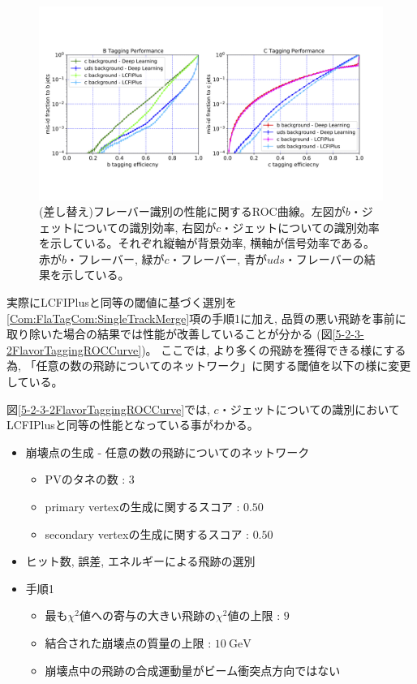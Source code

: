 \begin{figure}[htbp]
 \centering
 \includegraphics[trim = 0 150 0 200, width=1.0\textwidth, clip]{Figure/5Comparison/5-2-3-1FlavorTaggingROCCurve.png}
 \caption[(差し替え)フレーバータギングの性能に関するROC曲線]{(差し替え)フレーバー識別の性能に関するROC曲線。左図が$b$・ジェットについての識別効率, 右図が$c$・ジェットについての識別効率を示している。それぞれ縦軸が背景効率, 横軸が信号効率である。赤が$b$・フレーバー, 緑が$c$・フレーバー, 青が$uds$・フレーバーの結果を示している。}
 \label{5-2-3-1FlavorTaggingROCCurve}
\end{figure}

実際にLCFIPlusと同等の閾値に基づく選別を\ref{Com:FlaTagCom:SingleTrackMerge}項の手順1に加え, 品質の悪い飛跡を事前に取り除いた場合の結果では性能が改善していることが分かる (図\ref{5-2-3-2FlavorTaggingROCCurve})。
ここでは, より多くの飛跡を獲得できる様にする為, 「任意の数の飛跡についてのネットワーク」に関する閾値を以下の様に変更している。

図\ref{5-2-3-2FlavorTaggingROCCurve}では, $c$・ジェットについての識別においてLCFIPlusと同等の性能となっている事がわかる。

\newpage
\begin{itemize}
 \item 崩壊点の生成 - 任意の数の飛跡についてのネットワーク
 \begin{itemize}
   \item PVのタネの数 : $3$
   \item primary vertexの生成に関するスコア : $0.50$
   \item secondary vertexの生成に関するスコア : $0.50$
 \end{itemize}
 \item ヒット数, 誤差, エネルギーによる飛跡の選別
 \item 手順1
 \begin{itemize}
  \item 最も$\chi^2$値への寄与の大きい飛跡の$\chi^2$値の上限 : $9$
  \item 結合された崩壊点の質量の上限 : $10\ \mathrm{GeV}$
  \item 崩壊点中の飛跡の合成運動量がビーム衝突点方向ではない
 \end{itemize}
\end{itemize}

